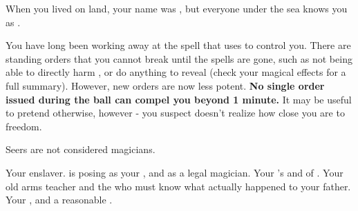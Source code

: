 \documentclass[char]{NeptuneBall}
\begin{document}
\begin{itemz}[Note]
  \item When you lived on land, your name was \cSlave{}, but everyone under the sea knows you as \cSlave{\full}.
	\item You have long been working away at the spell that \cWitch{} uses to control you. There are standing orders that you cannot break until the spells are gone, such as not being able to directly harm \cWitch{\them}, or do anything to reveal \cWitch{\them} (check your magical effects for a full summary). However, new orders are now less potent. {\bf No single order issued during the ball can compel you beyond 1 minute.} It may be useful to pretend otherwise, however - you suspect \cWitch{} doesn't realize how close you are to freedom.
  \item Seers are not considered magicians.
\end{itemz}

\begin{contacts}
  \contact{\cWitch{}} Your enslaver. \cWitch{\They} is posing as your \cWitch{\sibling}, and as a legal magician.
  \contact{\cAriel{}} Your \cEric{\sibling}'s \cAriel{\spouse} and \cAriel{\King} of \pAmerica{}.
  \contact{\cGeneral{}} Your old arms teacher and the \cGeneral{\mer} who must know what actually happened to your father.
  \contact{\cKing{}} Your \cKing{\King}, and a reasonable \cKing{\mer}.
\end{contacts}
\end{document}
